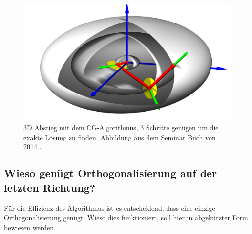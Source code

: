 \begin{figure}	
	\centering
	\includegraphics[width=0.8\hsize]{papers/cg/images/cg3d-large.jpg}
	\caption{3D Abstieg mit dem CG-Algorithmus, 3 Schritte genügen um die exakte Lösung zu finden. 
		Abbildung aus dem Seminar Buch von 2014 \cite{cg:book:hpc}.}
	\label{cg:abb:cg2}
\end{figure}

\subsection{Wieso genügt Orthogonalisierung auf der letzten Richtung?}
Für die Effizienz des Algorithmus ist es entscheidend, dass eine einzige Orthogonalisierung genügt.
Wieso dies funktioniert, soll hier in abgekürzter Form bewiesen werden.

